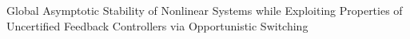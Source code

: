 Global Asymptotic Stability of Nonlinear Systems while Exploiting Properties of Uncertified Feedback Controllers via Opportunistic Switching%